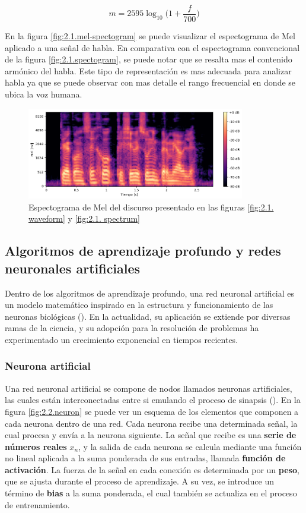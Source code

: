 \begin{equation}
    m = 2595\log_{10} \Big ( 1 + \frac{f}{700} \Big )
    \label{eq:2.1.mel_scale}
\end{equation}

En la figura \eqref{fig:2.1.mel-spectogram} se puede visualizar el espectograma de Mel aplicado a una señal de habla. En comparativa con el espectograma convencional de la figura \eqref{fig:2.1.spectogram}, se puede notar que se resalta mas el contenido armónico del habla. Este tipo de representación es mas adecuada para  analizar habla ya que se puede observar con mas detalle el rango frecuencial en donde se ubica la voz humana.


\begin{figure}[h]
    \centering
    \includegraphics[width=0.85\textwidth]{figures/2.1.mel-spectogram.png}
    \caption{Espectograma de Mel del discurso presentado en las figuras \eqref{fig:2.1. waveform} y \eqref{fig:2.1. spectrum}} 
    \label{fig:2.1.mel-spectogram}
\end{figure}

\subsection{Algoritmos de aprendizaje profundo y redes neuronales artificiales}
Dentro de los algoritmos de aprendizaje profundo, una red neuronal artificial es un modelo matemático inspirado en la estructura y funcionamiento de las neuronas biológicas (\cite{hardesty2017}). En la actualidad, su aplicación se extiende por diversas ramas de la ciencia, y su adopción para la resolución de problemas ha experimentado un crecimiento exponencial en tiempos recientes.

\subsubsection{Neurona artificial}
Una red neuronal artificial se compone de nodos llamados neuronas artificiales, las cuales están interconectadas entre si emulando el proceso de sinapsis (\cite{basheer2000}). En la figura \eqref{fig:2.2.neuron} se puede ver un esquema de los elementos que componen a cada neurona dentro de una red. Cada neurona recibe una determinada señal, la cual procesa y envía a la neurona siguiente. La señal que recibe es una \textbf{serie de números reales} $x_n$, y la salida de cada neurona se calcula mediante una función no lineal aplicada a la suma ponderada de sus entradas, llamada \textbf{función de activación}. La fuerza de la señal en cada conexión es determinada por un \textbf{peso}, que se ajusta durante el proceso de aprendizaje. A su vez, se introduce un término de \textbf{bias} a la suma ponderada, el cual también se actualiza en el proceso de entrenamiento.

